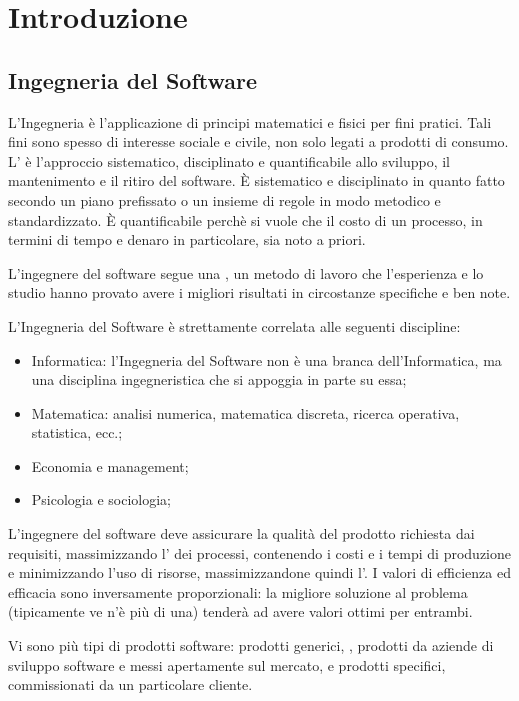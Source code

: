 \section{Introduzione}
\subsection{Ingegneria del Software}
L'Ingegneria è l'applicazione di principi matematici e fisici per fini pratici. Tali fini sono spesso di interesse sociale e civile, non solo legati a prodotti di consumo. L' è l'approccio sistematico, disciplinato e quantificabile allo sviluppo, il mantenimento e il ritiro del software. È sistematico e disciplinato in quanto fatto secondo un piano prefissato o un insieme di regole in modo metodico e standardizzato. È quantificabile perchè si vuole che il costo di un processo, in termini di tempo e denaro in particolare, sia noto a priori.

L'ingegnere del software segue una , un metodo di lavoro che l'esperienza e lo studio hanno provato avere i migliori risultati in circostanze specifiche e ben note.

L'Ingegneria del Software è strettamente correlata alle seguenti discipline:
\begin{itemize}
	\item Informatica: l'Ingegneria del Software non è una branca dell'Informatica, ma una disciplina ingegneristica che si appoggia in parte su essa;
	\item Matematica: analisi numerica, matematica discreta, ricerca operativa, statistica, ecc.;
	\item Economia e management;
	\item Psicologia e sociologia;
\end{itemize}

L'ingegnere del software deve assicurare la qualità del prodotto richiesta dai requisiti, massimizzando l' dei processi, contenendo i costi e i tempi di produzione e minimizzando l'uso di risorse, massimizzandone quindi l'. I valori di efficienza ed efficacia sono inversamente proporzionali: la migliore soluzione al problema (tipicamente ve n'è più di una) tenderà ad avere valori ottimi per entrambi.

Vi sono più tipi di prodotti software: prodotti generici, , prodotti da aziende di sviluppo software e messi apertamente sul mercato, e prodotti specifici, commissionati da un particolare cliente.

